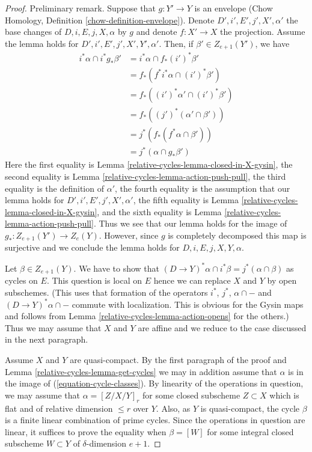 \begin{proof}
Preliminary remark.
Suppose that $g : Y' \to Y$ is an envelope (Chow Homology, Definition
\ref{chow-definition-envelope}).
Denote $D', i', E', j', X', \alpha'$ the base changes of
$D, i, E, j, X, \alpha$ by $g$ and denote $f : X' \to X$ the projection.
Assume the lemma holds for $D', i', E', j', X', Y', \alpha'$.
Then, if $\beta' \in Z_{e + 1}(Y')$, we have
\begin{align*}
i^*\alpha \cap i^*g_*\beta'
& =
i^*\alpha \cap f_*(i')^*\beta' \\
& =
f_*(f^*i^*\alpha \cap (i')^*\beta') \\
& =
f_*((i')^*\alpha' \cap (i')^*\beta') \\
& =
f_*((j')^*(\alpha' \cap \beta')) \\
& =
j^*(f_*(f^*\alpha \cap \beta')) \\
& =
j^*(\alpha \cap g_*\beta')
\end{align*}
Here the
first equality is Lemma \ref{relative-cycles-lemma-closed-in-X-gysin},
the second equality is Lemma \ref{relative-cycles-lemma-action-push-pull},
the third equality is the definition of $\alpha'$,
the fourth equality is the assumption that our lemma holds for
$D', i', E', j', X', \alpha'$,
the fifth equality is Lemma \ref{relative-cycles-lemma-closed-in-X-gysin}, and
the sixth equality is Lemma \ref{relative-cycles-lemma-action-push-pull}.
Thus we see that our lemma holds for the image of
$g_* : Z_{e + 1}(Y') \to Z_e(Y)$. However, since $g$ is completely
decomposed this map is surjective and we conclude the lemma holds
for $D, i, E, j, X, Y, \alpha$.

\medskip\noindent
Let $\beta \in Z_{e + 1}(Y)$. We have to show that
$(D \to Y)^*\alpha \cap i^*\beta = j^*(\alpha \cap \beta)$
as cycles on $E$. This question is local on $E$ hence we
can replace $X$ and $Y$ by open subschemes. (This uses that formation
of the operators $i^*$, $j^*$, $\alpha \cap - $ and
$(D \to Y)^*\alpha \cap -$ commute with localization. This is
obvious for the Gysin maps and follows from
Lemma \ref{relative-cycles-lemma-action-opens} for the others.)
Thus we may assume that $X$ and $Y$ are affine
and we reduce to the case discussed in the next paragraph.

\medskip\noindent
Assume $X$ and $Y$ are quasi-compact. By the first paragraph of the proof
and Lemma \ref{relative-cycles-lemma-get-cycles} we may in addition assume that $\alpha$
is in the image of (\ref{equation-cycle-classes}). By linearity
of the operations in question, we may assume that $\alpha = [Z/X/Y]_r$
for some closed subscheme $Z \subset X$ which is flat and of relative
dimension $\leq r$ over $Y$. Also, as $Y$ is quasi-compact, the cycle
$\beta$ is a finite linear combination of prime cycles. Since the operations
in question are linear, it suffices
to prove the equality when $\beta = [W]$ for some integral closed subscheme
$W \subset Y$ of $\delta$-dimension $e + 1$.


\end{proof}
